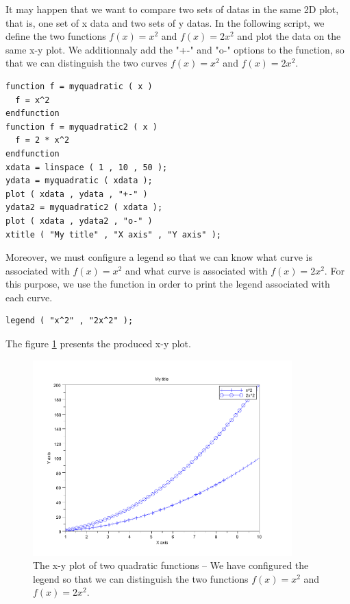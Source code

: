 It may happen that we want to compare two sets of datas in the 
same 2D plot, that is, one set of x data and two sets of y datas. 
In the following script, we define the two functions $f(x)=x^2$ and 
$f(x)=2x^2$ and plot the data on the same x-y plot.
We additionnaly add the "+-" and "o-" options to the  function,
so that we can distinguish the two curves $f(x)=x^2$ and 
$f(x)=2x^2$.
\lstset{language=scilabscript}
\begin{lstlisting}
function f = myquadratic ( x )
  f = x^2
endfunction
function f = myquadratic2 ( x )
  f = 2 * x^2
endfunction
xdata = linspace ( 1 , 10 , 50 );
ydata = myquadratic ( xdata );
plot ( xdata , ydata , "+-" )
ydata2 = myquadratic2 ( xdata );
plot ( xdata , ydata2 , "o-" )
xtitle ( "My title" , "X axis" , "Y axis" );
\end{lstlisting}

Moreover, we must configure a legend so that we can know what curve 
is associated with $f(x)=x^2$ and what curve is associated with $f(x)=2x^2$.
For this purpose, we use the  function in order to 
print the legend associated with each curve. 
\lstset{language=scilabscript}
\begin{lstlisting}
legend ( "x^2" , "2x^2" );
\end{lstlisting}

The figure \ref{fig-introscilab-demolegend} presents the produced x-y plot.
\begin{figure}
\begin{center}
\includegraphics[width=10cm]{introscilab/xyplot_legend.pdf}
\end{center}
\caption{The x-y plot of two quadratic functions -- We have configured the legend so that 
we can distinguish the two functions $f(x)=x^2$ and $f(x)=2x^2$.}
\label{fig-introscilab-demolegend}
\end{figure}

